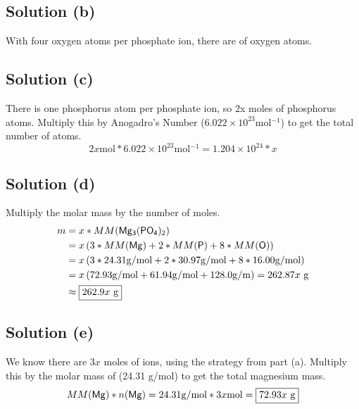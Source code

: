 \documentclass[10pt]{article}
\begin{document}
        \subsection{Solution (b)}
            With four oxygen atoms per phosphate ion, there are  of oxygen atoms.

        \subsection{Solution (c)}
            There is one phosphorus atom per phosphate ion, so 2x moles of phosphorus atoms.
            Multiply this by Anogadro's Number ($6.022 \times 10^{23} \unit{\mol^{-1}}$) to get the total number of atoms.
            \begin{equation}
                2x \unit{\mole} * 6.022 \times 10^{23} \unit{\mol^{-1}}
                    =   \boxed{1.204 \times 10^{24} * x}
            \end{equation}

        \subsection{Solution (d)}
            Multiply the molar mass by the number of moles.
            \begin{align}
                m   &=  x * MM(\ce{Mg3(PO4)2})\\
                    &=  x \left( 3*MM(\ce{Mg}) + 2 * MM(\ce{P}) + 8 * MM(\ce{O}) \right)\\
                    &=  x \left( 3 * 24.31 \unit{\gram/\mol} + 2 * 30.97 \unit{\gram/\mol} + 8 * 16.00 \unit{\gram/\mol} \right)\\
                    &=  x \left( 72.93 \unit{\gram/\mol} + 61.94 \unit{\gram/mol} + 128.0 \unit{\gram/\meter} \right)
                    =   262.87x\ \unit{\gram}\\
                    &\approx    \boxed{262.9x\ \unit{\gram}}
            \end{align}

        \subsection{Solution (e)}
            We know there are $3x$ moles of  ions, using the strategy from part (a).
            Multiply this by the molar mass of  (24.31 \unit{\gram/\mole}) to get the total magnesium mass. 
            \begin{equation}
                MM(\ce{Mg}) * n(\ce{Mg})    =   24.31 \unit{\gram/\mole} * 3x \unit{\mole}
                    =   \boxed{72.93x\ \unit{\gram}}
            \end{equation}
\end{document}
